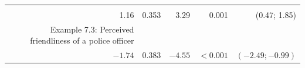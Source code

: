 \documentclass[11pt,a4paper,openany]{book}
\begin{document}
\begin{longtable}[]{@{}rrrrr@{}}
\begin{minipage}[t]{0.25\columnwidth}
\strut
\end{minipage} & \begin{minipage}[t]{0.08\columnwidth}\raggedleft\strut
\strut
\end{minipage} & \begin{minipage}[t]{0.09\columnwidth}\raggedleft\strut
\strut
\end{minipage} & \begin{minipage}[t]{0.14\columnwidth}\raggedleft\strut
\strut
\end{minipage}\tabularnewline
\begin{minipage}[t]{0.28\columnwidth}\raggedleft\strut
1.16\strut
\end{minipage} & \begin{minipage}[t]{0.25\columnwidth}\raggedleft\strut
0.353\strut
\end{minipage} & \begin{minipage}[t]{0.08\columnwidth}\raggedleft\strut
3.29\strut
\end{minipage} & \begin{minipage}[t]{0.09\columnwidth}\raggedleft\strut
0.001\strut
\end{minipage} & \begin{minipage}[t]{0.14\columnwidth}\raggedleft\strut
(0.47; 1.85)\strut
\end{minipage}\tabularnewline
\begin{minipage}[t]{0.28\columnwidth}\raggedleft\strut
Example 7.3: Perceived friendliness of a police officer\strut
\end{minipage} & \begin{minipage}[t]{0.25\columnwidth}\raggedleft\strut
\strut
\end{minipage} & \begin{minipage}[t]{0.08\columnwidth}\raggedleft\strut
\strut
\end{minipage} & \begin{minipage}[t]{0.09\columnwidth}\raggedleft\strut
\strut
\end{minipage} & \begin{minipage}[t]{0.14\columnwidth}\raggedleft\strut
\strut
\end{minipage}\tabularnewline
\begin{minipage}[t]{0.28\columnwidth}\raggedleft\strut
\(-1.74\)\strut
\end{minipage} & \begin{minipage}[t]{0.25\columnwidth}\raggedleft\strut
0.383\strut
\end{minipage} & \begin{minipage}[t]{0.08\columnwidth}\raggedleft\strut
\(-4.55\)\strut
\end{minipage} & \begin{minipage}[t]{0.09\columnwidth}\raggedleft\strut
\(<0.001\)\strut
\end{minipage} & \begin{minipage}[t]{0.14\columnwidth}\raggedleft\strut
\((-2.49; -0.99)\)\strut
\end{minipage}\tabularnewline
\bottomrule
\end{longtable}
\end{document}
